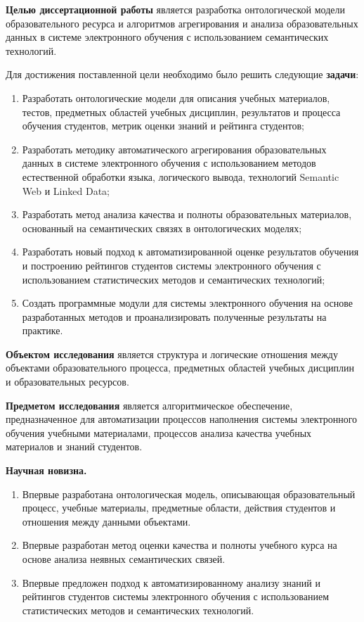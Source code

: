 \textbf{Целью диссертационной работы} является разработка онтологической модели образовательного ресурса и алгоритмов агрегирования и анализа образовательных данных в системе электронного обучения с использованием семантических технологий. 

Для достижения поставленной цели необходимо было решить следующие \textbf{задачи}:
\begin{enumerate}
 \item Разработать онтологические модели для описания учебных материалов, тестов, предметных областей учебных дисциплин, результатов и процесса обучения студентов, метрик оценки знаний и рейтинга студентов;
 \item Разработать методику автоматического агрегирования образовательных данных в системе электронного обучения с использованием методов естественной обработки языка, логического вывода, технологий Semantic Web и Linked Data;
 \item Разработать метод анализа качества и полноты образовательных материалов, основанный на семантических связях в онтологических моделях;
  \item Разработать новый подход к автоматизированной оценке результатов обучения и построению рейтингов студентов системы электронного обучения с использованием статистических методов и семантических технологий;
  \item Создать программные модули для системы электронного обучения на основе разработанных методов и проанализировать полученные результаты на практике.  
 \end{enumerate}

\textbf{Объектом исследования} является структура и логические отношения между объектами образовательного процесса, предметных областей учебных дисциплин и образовательных ресурсов.  

\textbf{Предметом исследования} является алгоритмическое обеспечение, предназначенное для автоматизации процессов наполнения системы электронного обучения учебными материалами, процессов анализа качества учебных материалов и знаний студентов. 

\textbf{Научная новизна.}
\begin{enumerate}
 \item Впервые разработана онтологическая модель, описывающая образовательный процесс, учебные материалы, предметные области, действия студентов и отношения между данными объектами. 
 \item Впервые разработан метод оценки качества и полноты учебного курса на основе анализа неявных семантических связей.
 \item Впервые предложен подход к автоматизированному анализу знаний и рейтингов студентов системы электронного обучения с использованием статистических методов и семантических технологий.
\end{enumerate}

